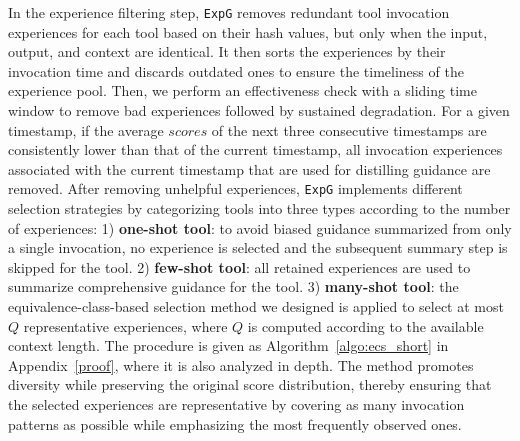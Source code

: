 \documentclass[11pt]{article}
\newcommand{\ours}{\texttt{ExpG}}
\begin{document}
In the experience filtering step, {\ours} removes redundant tool invocation experiences for each tool based on their hash values, but only when the input, output, and context are identical. It then sorts the experiences by their invocation time and discards outdated ones to ensure the timeliness of the experience pool. Then, we perform an effectiveness check with a sliding time window to remove bad experiences followed by sustained degradation. For a given timestamp, if the average $scores$ of the next three consecutive timestamps are consistently lower than that of the current timestamp, all invocation experiences associated with the current timestamp that are used for distilling guidance are removed. 
After removing unhelpful experiences, {\ours} implements different selection strategies by categorizing tools into three types according to the number of experiences: 1) \textbf{one-shot tool}: 
to avoid biased guidance summarized from only a single invocation, no experience 
is selected and the subsequent summary step is skipped for the tool. 2) \textbf{few-shot tool}: all retained experiences are used to summarize comprehensive guidance for the tool. 3) \textbf{many-shot tool}: the equivalence-class-based selection method we designed is applied to select at most $Q$ representative experiences, where $Q$ is computed according to the available context length. 
The procedure is given as Algorithm~\ref{algo:ecs_short} in Appendix~\ref{proof}, where it is also analyzed in depth. 
The method promotes diversity while preserving the original score distribution, thereby ensuring that the selected experiences are representative by covering as many invocation patterns as possible while emphasizing the most frequently observed ones. 
\end{document}
